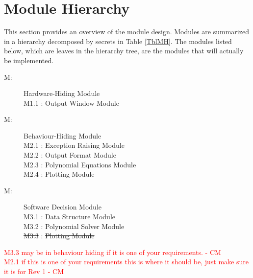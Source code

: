 \documentclass[12pt, titlepage]{article}
\newcounter{mnum}
\newcommand{\mthemnum}{M\themnum}
\begin{document}
\section{Module Hierarchy} \label{SecMH}

This section provides an overview of the module design. Modules are summarized
in a hierarchy decomposed by secrets in Table \ref{TblMH}. The modules listed
below, which are leaves in the hierarchy tree, are the modules that will
actually be implemented.

\begin{description}
\item [ \mthemnum \label{mHH}:] Hardware-Hiding Module \\ 
\setlength\parindent{24pt} M1.1 \label{mOW}: Output Window Module 
\item [ \mthemnum \label{mBH}:] Behaviour-Hiding Module \\
\setlength\parindent{24pt} M2.1 \label{mER}: Exception Raising Module \\
\setlength\parindent{24pt} M2.2 \label{mOF}: Output Format Module \\
\setlength\parindent{24pt} M2.3 \label{mPE}: Polynomial Equations Module\\
\setlength\parindent{24pt} M2.4 \label{mPE}: Plotting Module
\item [ \mthemnum \label{mSD}:] Software Decision Module \\
\setlength\parindent{24pt} M3.1 \label{mDS}: Data Structure Module \\
\setlength\parindent{24pt} M3.2 \label{mPS}: Polynomial Solver Module \\
\setlength\parindent{24pt} \st{M3.3} \label{mP}: \st{Plotting Module}
\end{description}
\textcolor{red}{M3.3 may be in behaviour hiding if it is one of your requirements. - CM} \\
\textcolor{red}{M2.1 if this is one of your requirements this is where it should be, just make sure it is for Rev 1 - CM} \\
\end{document}
